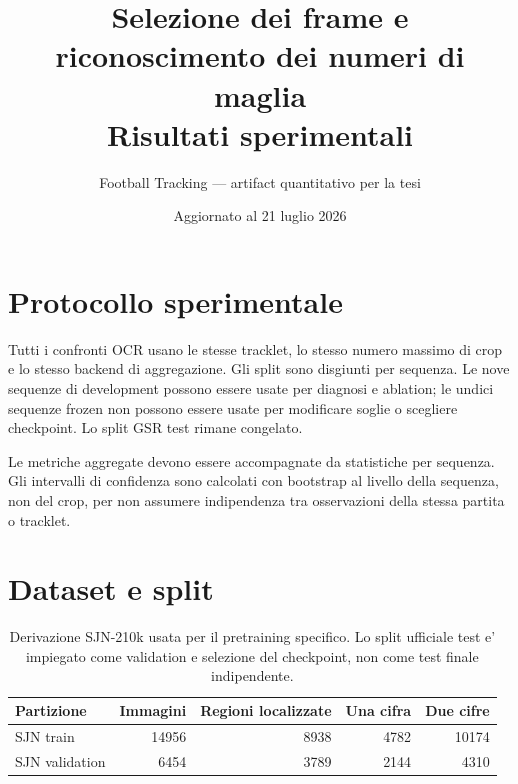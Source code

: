 \documentclass[11pt,a4paper]{article}
\title{Selezione dei frame e riconoscimento dei numeri di maglia\\
Risultati sperimentali}
\author{Football Tracking --- artifact quantitativo per la tesi}
\date{Aggiornato al 21 luglio 2026}
\begin{document}
\maketitle

\section{Protocollo sperimentale}

Tutti i confronti OCR usano le stesse tracklet, lo stesso numero massimo di
crop e lo stesso backend di aggregazione. Gli split sono disgiunti per
sequenza. Le nove sequenze di development possono essere usate per diagnosi e
ablation; le undici sequenze frozen non possono essere usate per modificare
soglie o scegliere checkpoint. Lo split GSR test rimane congelato.

Le metriche aggregate devono essere accompagnate da statistiche per sequenza.
Gli intervalli di confidenza sono calcolati con bootstrap al livello della
sequenza, non del crop, per non assumere indipendenza tra osservazioni della
stessa partita o tracklet.

\section{Dataset e split}

\begin{table}[htbp]
  \centering
  \caption{Split usati negli esperimenti jersey. Una sequenza puo' comparire
  soltanto nel ruolo dichiarato per lo stesso esperimento.}
  \label{tab:dataset-splits}
\end{table}

\begin{table}[htbp]
  \centering
  \caption{Derivazione SJN-210k usata per il pretraining specifico. Lo split
  ufficiale test e' impiegato come validation e selezione del checkpoint, non
  come test finale indipendente.}
  \label{tab:sjn-dataset}
  \begin{tabular}{lrrrr}
    \toprule
    Partizione & Immagini & Regioni localizzate & Una cifra & Due cifre \\
    \midrule
    SJN train & 14956 & 8938 & 4782 & 10174 \\
    SJN validation & 6454 & 3789 & 2144 & 4310 \\
    \bottomrule
  \end{tabular}
\end{table}
\end{document}
